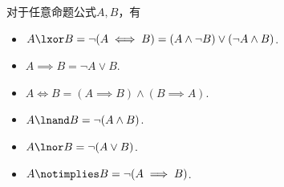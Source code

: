 
对于任意命题公式\(A,B\)，有\begin{itemize}
	\item \(A \lxor B
	= \neg(A \iff B)
	= (A \land \neg B) \lor (\neg A \land B)\).
	\item \(A \implies B
	= \neg A \lor B\).
	\item \(A \iff B
	= (A \implies B) \land (B \implies A)\).
	\item \(A \lnand B
	= \neg(A \land B)\).
	\item \(A \lnor B
	= \neg(A \lor B)\).
	\item \(A \notimplies B
	= \neg(A \implies B)\).
\end{itemize}
